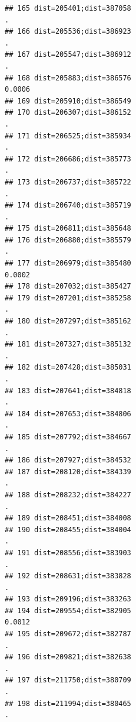 \documentclass[
]{article}
\begin{document}
\begin{verbatim}
## 165 dist=205401;dist=387058                                              .
## 166 dist=205536;dist=386923                                              .
## 167 dist=205547;dist=386912                                              .
## 168 dist=205883;dist=386576                                         0.0006
## 169 dist=205910;dist=386549                                               
## 170 dist=206307;dist=386152                                              .
## 171 dist=206525;dist=385934                                              .
## 172 dist=206686;dist=385773                                              .
## 173 dist=206737;dist=385722                                              .
## 174 dist=206740;dist=385719                                              .
## 175 dist=206811;dist=385648                                               
## 176 dist=206880;dist=385579                                              .
## 177 dist=206979;dist=385480                                         0.0002
## 178 dist=207032;dist=385427                                               
## 179 dist=207201;dist=385258                                              .
## 180 dist=207297;dist=385162                                              .
## 181 dist=207327;dist=385132                                              .
## 182 dist=207428;dist=385031                                              .
## 183 dist=207641;dist=384818                                              .
## 184 dist=207653;dist=384806                                              .
## 185 dist=207792;dist=384667                                              .
## 186 dist=207927;dist=384532                                               
## 187 dist=208120;dist=384339                                              .
## 188 dist=208232;dist=384227                                              .
## 189 dist=208451;dist=384008                                               
## 190 dist=208455;dist=384004                                              .
## 191 dist=208556;dist=383903                                              .
## 192 dist=208631;dist=383828                                              .
## 193 dist=209196;dist=383263                                               
## 194 dist=209554;dist=382905                                         0.0012
## 195 dist=209672;dist=382787                                              .
## 196 dist=209821;dist=382638                                              .
## 197 dist=211750;dist=380709                                              .
## 198 dist=211994;dist=380465                                              .

\end{verbatim}
\end{document}
